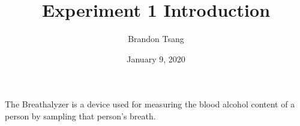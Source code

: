 \documentclass{article}
\title{Experiment 1 Introduction}
\author{Brandon Tsang}
\date{January 9, 2020}
\begin{document}
\maketitle
The Breathalyzer is a device used for measuring the blood alcohol content of a person by sampling that person's breath.
\end{document}
